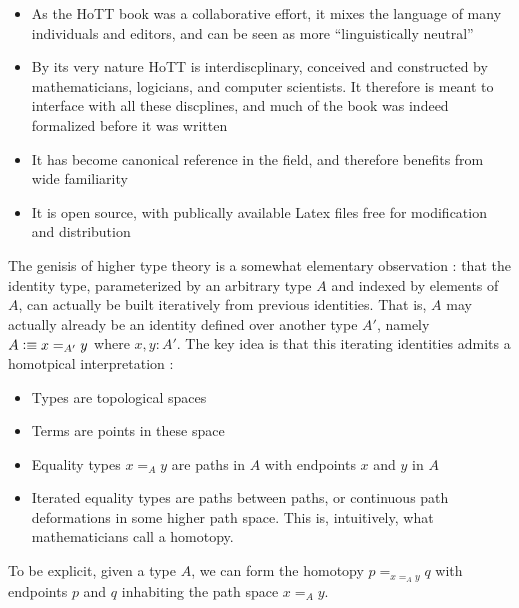 \documentclass[11pt, a4paper]{article}
\begin{document}
\begin{itemize}[noitemsep]

\item As the HoTT book was a collaborative effort, it mixes the language of many
individuals and editors, and can be seen as more ``linguistically neutral''

\item By its very nature HoTT is interdiscplinary, conceived and constructed by
mathematicians, logicians, and computer scientists. It therefore is meant to
interface with all these discplines, and much of the book was indeed formalized
before it was written

\item It has become canonical reference in the field, and therefore benefits
from wide familiarity

\item It is open source, with publically available Latex files free for
modification and distribution

\end{itemize}

The genisis of higher type theory is a somewhat elementary observation : that
the identity type, parameterized by an arbitrary type $A$ and indexed by
elements of $A$, can actually be built iteratively from previous identities.
That is, $A$ may actually already be an identity defined over another type $A'$,
namely $A \vcentcolon\equiv x=_{A'} y$ where $x,y:A'$. The key idea is that this iterating
identities admits a homotpical interpretation :

\begin{itemize}[noitemsep]

\item Types are topological spaces
\item Terms are points in these space

\item Equality types $x=_{A} y$ are paths in $A$ with endpoints $x$ and $y$ in
$A$

\item Iterated equality types are paths between paths, or continuous path
deformations in some higher path space. This is, intuitively, what
mathematicians call a homotopy.

\end{itemize}

To be explicit, given a type $A$, we can form the homotopy $p=_{x=_{A} y}q$ with
endpoints $p$ and $q$ inhabiting the path space $x=_{A} y$.
\end{document}
